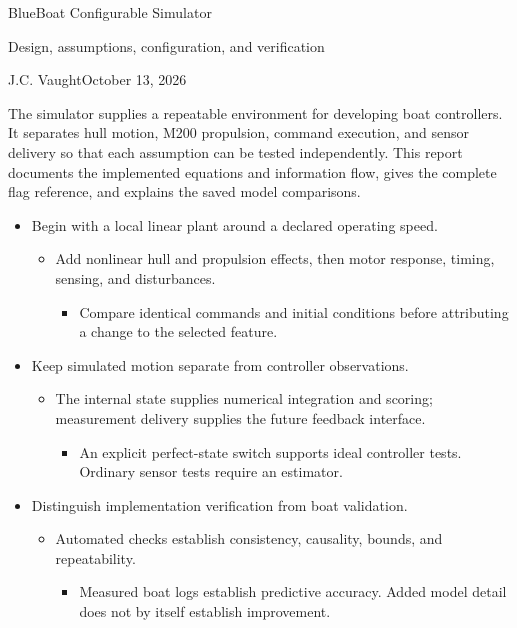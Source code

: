 \documentclass[10pt,letterpaper]{article}
\begin{document}
\fontsize{10.5}{12.6}\selectfont
{\color{navy}\fontsize{25}{28}\selectfont BlueBoat Configurable Simulator\par}
\vspace{4pt}
{\fontsize{16}{18}\selectfont Design, assumptions, configuration, and verification\par}
\vspace{8pt}
J.C. Vaught\hfill October 13, 2026
\vspace{10pt}

The simulator supplies a repeatable environment for developing boat controllers. It separates hull motion, M200 propulsion, command execution, and sensor delivery so that each assumption can be tested independently. This report documents the implemented equations and information flow, gives the complete flag reference, and explains the saved model comparisons.

\begin{itemize}
\item
  Begin with a local linear plant around a declared operating speed.

  \begin{itemize}
  \item
    Add nonlinear hull and propulsion effects, then motor response, timing, sensing, and disturbances.

    \begin{itemize}
    \item
      Compare identical commands and initial conditions before attributing a change to the selected feature.
    \end{itemize}
  \end{itemize}
\item
  Keep simulated motion separate from controller observations.

  \begin{itemize}
  \item
    The internal state supplies numerical integration and scoring; measurement delivery supplies the future feedback interface.

    \begin{itemize}
    \item
      An explicit perfect-state switch supports ideal controller tests. Ordinary sensor tests require an estimator.
    \end{itemize}
  \end{itemize}
\item
  Distinguish implementation verification from boat validation.

  \begin{itemize}
  \item
    Automated checks establish consistency, causality, bounds, and repeatability.

    \begin{itemize}
    \item
      Measured boat logs establish predictive accuracy. Added model detail does not by itself establish improvement.
    \end{itemize}
  \end{itemize}
\end{itemize}
\end{document}
